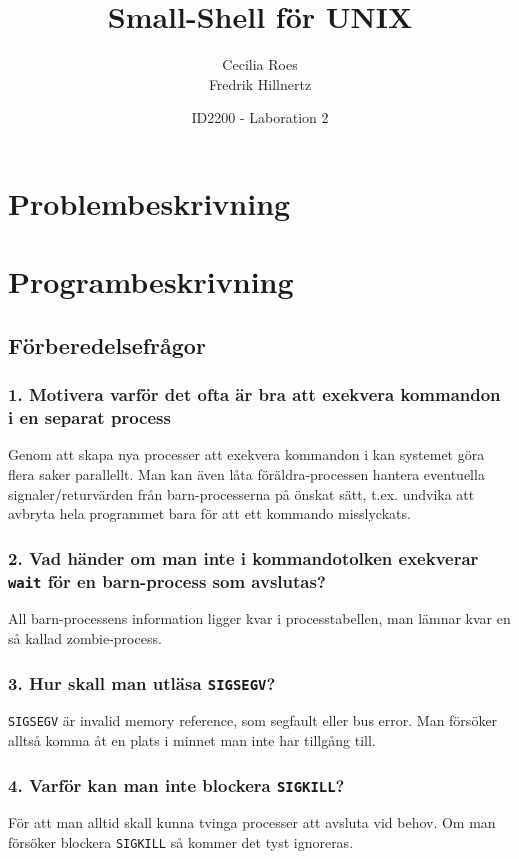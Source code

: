 \documentclass[a4paper]{article}
\title{Small-Shell för UNIX}
\date{ID2200 - Laboration 2}
\author{Cecilia Roes \\ Fredrik Hillnertz}
\begin{document}

\maketitle

\section*{Problembeskrivning}

\section*{Programbeskrivning}

\subsection*{Förberedelsefrågor}
\subsubsection*{1. Motivera varför det ofta är bra att exekvera kommandon i en separat process}
Genom att skapa nya processer att exekvera kommandon i kan systemet göra flera saker parallellt. Man kan även låta föräldra-processen hantera eventuella signaler/returvärden från barn-processerna på önskat sätt, t.ex. undvika att avbryta hela programmet bara för att ett kommando misslyckats.

\subsubsection*{2. Vad händer om man inte i kommandotolken exekverar \texttt{wait} för en barn-process som avslutas?}
All barn-processens information ligger kvar i processtabellen, man lämnar kvar en så kallad zombie-process.

\subsubsection*{3. Hur skall man utläsa \texttt{SIGSEGV}?}
\texttt{SIGSEGV} är invalid memory reference, som segfault eller bus error. Man försöker alltså komma åt en plats i minnet man inte har tillgång till.

\subsubsection*{4. Varför kan man inte blockera \texttt{SIGKILL}?}
För att man alltid skall kunna tvinga processer att avsluta vid behov. Om man försöker blockera \texttt{SIGKILL} så kommer det tyst ignoreras.
\end{document}
